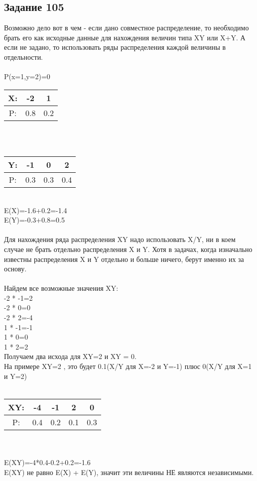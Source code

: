 \documentclass[12pt]{article}
\begin{document}
\subsection{Задание 105}
Возможно дело вот в чем - если дано совместное распределение, то необходимо брать его как исходные данные для нахождения величин типа XY или X+Y. А если не задано, то использовать ряды распределения каждой величины в отдельности.\\
\\
P(x=1,y=2)=0\\
\begin{tabular}{|c|c|c|}
\hline
X: & -2 & 1  \\
\hline
P: & 0.8 & 0.2  \\
\hline
\end{tabular}
\\
\\
\begin{tabular}{|c|c|c|c|}
\hline
Y: & -1 & 0 & 2  \\
\hline
P: & 0.3 & 0.3 & 0.4  \\
\hline
\end{tabular}
\\
E(X)=-1.6+0.2=-1.4\\
E(Y)=-0.3+0.8=0.5\\
\\
Для нахождения ряда распределения XY надо использовать X/Y, ни в коем случае не брать отдельно распределения X и Y. Хотя в задачах, когда изначально известны распределения X и Y отдельно и больше ничего, берут именно их за основу.\\
\\
Найдем все возможные значения XY:\\
-2 * -1=2\\
-2 * 0=0\\
-2 * 2=-4\\
1 * -1=-1\\
1 * 0=0\\
1 * 2=2\\
Получаем два исхода для XY=2 и XY = 0.\\
На примере XY=2 , это будет 0.1(X/Y для X=-2 и Y=-1) плюс 0(X/Y для X=1 и Y=2)\\
\\
\begin{tabular}{|c|c|c|c|c|}
\hline
XY: & -4 & -1 & 2 & 0\\
\hline
P: & 0.4 & 0.2 & 0.1 & 0.3  \\
\hline
\end{tabular}
\\ 
\\
E(XY)=-4*0.4-0.2+0.2=-1.6\\
E(XY) не равно E(X) + E(Y), значит эти величины НЕ являются независимыми.
\newpage
\end{document}
